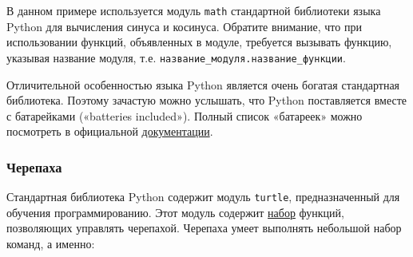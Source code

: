 В данном примере используется модуль \texttt{math} стандартной
библиотеки языка Python для вычисления синуса и косинуса. Обратите
внимание, что при использовании функций, объявленных в модуле, требуется
вызывать функцию, указывая название модуля, т.е.
\texttt{название\_модуля.название\_функции}.

Отличительной особенностью языка Python является очень богатая
стандартная библиотека. Поэтому зачастую можно услышать, что Python
поставляется вместе с батарейками («batteries included»). Полный список
«батареек» можно посмотреть в официальной
\href{https://docs.python.org/3/py-modindex.html}{документации}.

\subsubsection{Черепаха}\label{ux447ux435ux440ux435ux43fux430ux445ux430}

Стандартная библиотека Python содержит модуль \texttt{turtle},
предназначенный для обучения программированию. Этот модуль содержит
\href{https://docs.python.org/3/library/turtle.html\#methods-of-rawturtle-turtle-and-corresponding-functions}{набор}
функций, позволяющих управлять черепахой. Черепаха умеет выполнять
небольшой набор команд, а именно:

